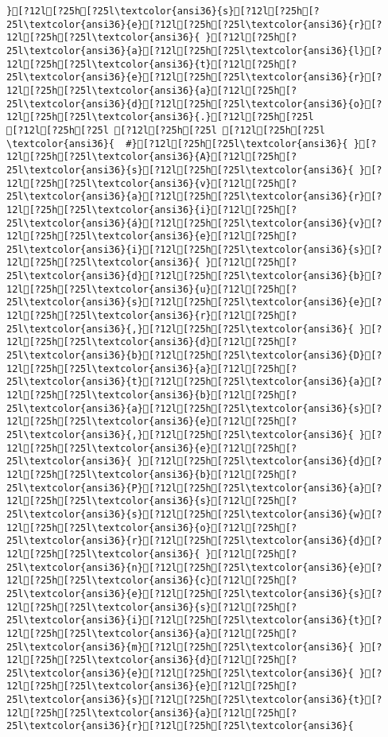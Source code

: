 \documentclass{scrartcl}
\begin{document}
\begin{Verbatim}
}[?12l[?25h[?25l\textcolor{ansi36}{s}[?12l[?25h[?25l\textcolor{ansi36}{e}[?12l[?25h[?25l\textcolor{ansi36}{r}[?12l[?25h[?25l\textcolor{ansi36}{ }[?12l[?25h[?25l\textcolor{ansi36}{a}[?12l[?25h[?25l\textcolor{ansi36}{l}[?12l[?25h[?25l\textcolor{ansi36}{t}[?12l[?25h[?25l\textcolor{ansi36}{e}[?12l[?25h[?25l\textcolor{ansi36}{r}[?12l[?25h[?25l\textcolor{ansi36}{a}[?12l[?25h[?25l\textcolor{ansi36}{d}[?12l[?25h[?25l\textcolor{ansi36}{o}[?12l[?25h[?25l\textcolor{ansi36}{.}[?12l[?25h[?25l
[?12l[?25h[?25l [?12l[?25h[?25l [?12l[?25h[?25l
\textcolor{ansi36}{  #}[?12l[?25h[?25l\textcolor{ansi36}{ }[?12l[?25h[?25l\textcolor{ansi36}{A}[?12l[?25h[?25l\textcolor{ansi36}{s}[?12l[?25h[?25l\textcolor{ansi36}{ }[?12l[?25h[?25l\textcolor{ansi36}{v}[?12l[?25h[?25l\textcolor{ansi36}{a}[?12l[?25h[?25l\textcolor{ansi36}{r}[?12l[?25h[?25l\textcolor{ansi36}{i}[?12l[?25h[?25l\textcolor{ansi36}{á}[?12l[?25h[?25l\textcolor{ansi36}{v}[?12l[?25h[?25l\textcolor{ansi36}{e}[?12l[?25h[?25l\textcolor{ansi36}{i}[?12l[?25h[?25l\textcolor{ansi36}{s}[?12l[?25h[?25l\textcolor{ansi36}{ }[?12l[?25h[?25l\textcolor{ansi36}{d}[?12l[?25h[?25l\textcolor{ansi36}{b}[?12l[?25h[?25l\textcolor{ansi36}{u}[?12l[?25h[?25l\textcolor{ansi36}{s}[?12l[?25h[?25l\textcolor{ansi36}{e}[?12l[?25h[?25l\textcolor{ansi36}{r}[?12l[?25h[?25l\textcolor{ansi36}{,}[?12l[?25h[?25l\textcolor{ansi36}{ }[?12l[?25h[?25l\textcolor{ansi36}{d}[?12l[?25h[?25l\textcolor{ansi36}{b}[?12l[?25h[?25l\textcolor{ansi36}{D}[?12l[?25h[?25l\textcolor{ansi36}{a}[?12l[?25h[?25l\textcolor{ansi36}{t}[?12l[?25h[?25l\textcolor{ansi36}{a}[?12l[?25h[?25l\textcolor{ansi36}{b}[?12l[?25h[?25l\textcolor{ansi36}{a}[?12l[?25h[?25l\textcolor{ansi36}{s}[?12l[?25h[?25l\textcolor{ansi36}{e}[?12l[?25h[?25l\textcolor{ansi36}{,}[?12l[?25h[?25l\textcolor{ansi36}{ }[?12l[?25h[?25l\textcolor{ansi36}{e}[?12l[?25h[?25l\textcolor{ansi36}{ }[?12l[?25h[?25l\textcolor{ansi36}{d}[?12l[?25h[?25l\textcolor{ansi36}{b}[?12l[?25h[?25l\textcolor{ansi36}{P}[?12l[?25h[?25l\textcolor{ansi36}{a}[?12l[?25h[?25l\textcolor{ansi36}{s}[?12l[?25h[?25l\textcolor{ansi36}{s}[?12l[?25h[?25l\textcolor{ansi36}{w}[?12l[?25h[?25l\textcolor{ansi36}{o}[?12l[?25h[?25l\textcolor{ansi36}{r}[?12l[?25h[?25l\textcolor{ansi36}{d}[?12l[?25h[?25l\textcolor{ansi36}{ }[?12l[?25h[?25l\textcolor{ansi36}{n}[?12l[?25h[?25l\textcolor{ansi36}{e}[?12l[?25h[?25l\textcolor{ansi36}{c}[?12l[?25h[?25l\textcolor{ansi36}{e}[?12l[?25h[?25l\textcolor{ansi36}{s}[?12l[?25h[?25l\textcolor{ansi36}{s}[?12l[?25h[?25l\textcolor{ansi36}{i}[?12l[?25h[?25l\textcolor{ansi36}{t}[?12l[?25h[?25l\textcolor{ansi36}{a}[?12l[?25h[?25l\textcolor{ansi36}{m}[?12l[?25h[?25l\textcolor{ansi36}{ }[?12l[?25h[?25l\textcolor{ansi36}{d}[?12l[?25h[?25l\textcolor{ansi36}{e}[?12l[?25h[?25l\textcolor{ansi36}{ }[?12l[?25h[?25l\textcolor{ansi36}{e}[?12l[?25h[?25l\textcolor{ansi36}{s}[?12l[?25h[?25l\textcolor{ansi36}{t}[?12l[?25h[?25l\textcolor{ansi36}{a}[?12l[?25h[?25l\textcolor{ansi36}{r}[?12l[?25h[?25l\textcolor{ansi36}{ 
\end{Verbatim}
\end{document}
